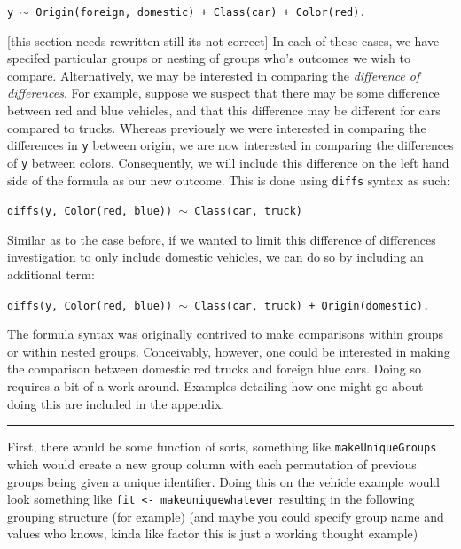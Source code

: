 \documentclass{article}
\newcommand{\xt}{\texttt}%
\begin{document}
\begin{center}
\tt y $\sim$ Origin(foreign, domestic) + Class(car) + Color(red).
\end{center}


[this section needs rewritten still its not correct]
In each of these cases, we have specifed particular groups or nesting of groups who's outcomes we wish to compare. Alternatively, we may be interested in comparing the \textit{difference of differences}. For example, suppose we suspect that there may be some difference between red and blue vehicles, and that this difference may be different for cars compared to trucks. Whereas previously we were interested in comparing the differences in \xt{y} between origin, we are now interested in comparing the differences of \xt{y} between colors. Consequently, we will include this difference on the left hand side of the formula as our new outcome. This is done using \xt{diffs} syntax as such:

\begin{center}
\tt diffs(y, Color(red, blue)) $\sim$ Class(car, truck)
\end{center}

Similar as to the case before, if we wanted to limit this difference of differences investigation to only include domestic vehicles, we can do so by including an additional term:

\begin{center}
\tt diffs(y, Color(red, blue)) $\sim$ Class(car, truck) + Origin(domestic).
\end{center}

The formula syntax was originally contrived to make comparisons within groups or within nested groups. Conceivably, however, one could be interested in making the comparison between domestic red trucks and foreign blue cars. Doing so requires a bit of a work around. Examples detailing how one might go about doing this are included in the appendix.

\noindent\rule{2cm}{0.4pt}


First, there would be some function of sorts, something like \xt{makeUniqueGroups} which would create a new group column with each permutation of previous groups being given a unique identifier. Doing this on the vehicle example would look something like \xt{fit <- makeuniquewhatever} resulting in the following grouping structure (for example) (and maybe you could specify group name and values who knows, kinda like factor this is just a working thought example)
\end{document}
